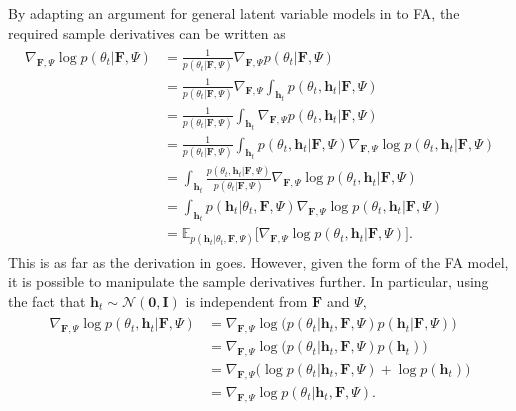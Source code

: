 \documentclass[msc,deptreport.inf]{infthesis} %
\newcommand{\matr}[1]{\mathbf{#1}}
\newcommand{\E}{\mathbb E}
\begin{document}
By adapting an argument for general latent variable models in \cite{barber2007} to FA, the required sample derivatives can be written as
\begin{align}\label{eqn:grad_log_likelihood}
\begin{split}
	\nabla_{\matr{F}, \Psi} \log p(\theta_t | \matr{F}, \Psi) 
	& = \frac{1}{p(\theta_t | \matr{F}, \Psi)} \nabla_{\matr{F}, \Psi} p(\theta_t | \matr{F}, \Psi) \\
	& = \frac{1}{p(\theta_t | \matr{F}, \Psi)} \nabla_{\matr{F}, \Psi} \int_{\matr{h}_t} p(\theta_t, \matr{h}_t | \matr{F}, \Psi) \\
	& = \frac{1}{p(\theta_t | \matr{F}, \Psi)} \int_{\matr{h}_t} \nabla_{\matr{F}, \Psi} p(\theta_t, \matr{h}_t | \matr{F}, \Psi) \\
	& = \frac{1}{p(\theta_t | \matr{F}, \Psi)} \int_{\matr{h}_t} p(\theta_t, \matr{h}_t | \matr{F}, \Psi) \nabla_{\matr{F}, \Psi} \log p(\theta_t, \matr{h}_t | \matr{F}, \Psi) \\
	& = \int_{\matr{h}_t} \frac{p(\theta_t, \matr{h}_t | \matr{F}, \Psi)}{p(\theta_t | \matr{F}, \Psi)} \nabla_{\matr{F}, \Psi} \log p(\theta_t, \matr{h}_t | \matr{F}, \Psi) \\
	& = \int_{\matr{h}_t} p(\matr{h}_t | \theta_t, \matr{F}, \Psi) \nabla_{\matr{F}, \Psi} \log p(\theta_t, \matr{h}_t | \matr{F}, \Psi) \\
	& = \E_{p(\matr{h}_t | \theta_t, \matr{F}, \Psi)} \big[ \nabla_{\matr{F}, \Psi} \log p(\theta_t, \matr{h}_t | \matr{F}, \Psi) \big].
\end{split}
\end{align}
This is as far as the derivation in \cite{barber2007} goes. However, given the form of the FA model, it is possible to manipulate the sample derivatives further. In particular, using the fact that $\matr{h}_t \sim \mathcal{N}(\matr{0}, \matr{I})$ is independent from $\matr{F}$ and $\Psi$,
\begin{align}\label{eqn:grad_log_complete_likelihood}
\begin{split}
	\nabla_{\matr{F}, \Psi} \log p(\theta_t, \matr{h}_t | \matr{F}, \Psi)
	& = \nabla_{\matr{F}, \Psi} \log \big(p(\theta_t | \matr{h}_t, \matr{F}, \Psi)p(\matr{h}_t | \matr{F}, \Psi)\big) \\
	& = \nabla_{\matr{F}, \Psi} \log \big(p(\theta_t | \matr{h}_t, \matr{F}, \Psi)p(\matr{h}_t)\big) \\
	& = \nabla_{\matr{F}, \Psi} \big( \log p(\theta_t | \matr{h}_t, \matr{F}, \Psi) + \log p(\matr{h}_t)\big) \\
	& = \nabla_{\matr{F}, \Psi} \log p(\theta_t | \matr{h}_t, \matr{F}, \Psi).
\end{split}
\end{align}
\end{document}

